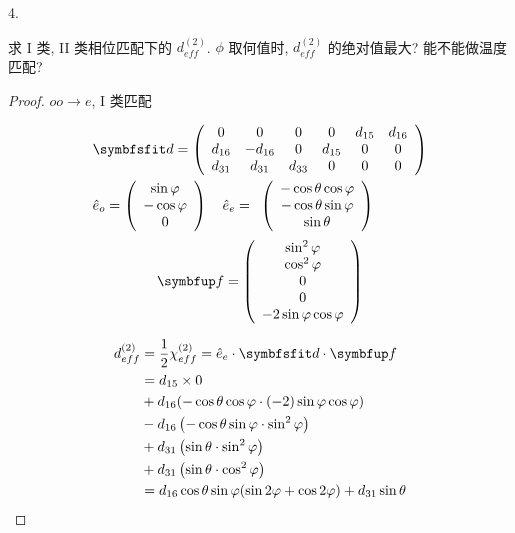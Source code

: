 \begin{exercise}

4. 

求 I 类, II 类相位匹配下的 $d_{eff}^{(2)}$. $\phi$ 取何值时, 
$d_{eff}^{(2)}$ 的绝对值最大? 能不能做温度匹配?

\end{exercise}

\begin{proof}

$oo\rightarrow e$, I 类匹配

$$
\begin{aligned}
&\Tens{d}=\left(\begin{array}{cccccc}
{0} & {0} & {0} & {0} & {d_{15}}&{ d_{16}} \\
{d_{16}} & {-d_{16}} & {0} & {d_{15}} & {0} & {0} \\
{d_{31}} & {d_{31}} & {d_{33}} & {0} & {0} &{0}
\end{array}\right)\\
&\hat{e}_o=\left(\begin{array}{cc}
{\sin \varphi} \\
{-\cos \varphi} \\
{0}
\end{array}\right) \quad \hat{e}_{e}=\begin{array}{c}
{\left(\begin{array}{c}
{-\cos \theta \cos \varphi} \\
{-\cos \theta \sin \varphi} \\
{\sin \theta}
\end{array}\right)}
\end{array}
\end{aligned}
$$
$$
\Vect{f}=\left(\begin{array}{c}
{\sin ^{2} \varphi} \\
{\cos ^{2} \varphi} \\
{0} \\
{0} \\
{-2 \sin \varphi \cos \varphi}
\end{array}\right)
$$

$$
\begin{aligned}
d_{e f f}^{(2)} &=\frac{1}{2} \chi_{e f f}^{(2)}=\hat{e}_{e} \cdot \Tens{d} \cdot \Vect{f} \\
&=d_{15} \times 0 \\
&+d_{16}(-\cos\theta \cos \varphi \cdot(-2) \sin \varphi \cos\varphi) \\
&-d_{16}\left(-\cos \theta \sin \varphi \cdot \sin ^{2} \varphi\right) \\
&+d_{31}\left(\sin \theta \cdot \sin ^{2} \varphi\right) \\
&+d_{31}\left(\sin \theta \cdot \cos ^{2} \varphi\right) \\
&= d_{16}  \cos \theta \sin \varphi(\sin 2 \varphi+\cos 2 \varphi)+d_{31} \sin \theta
\end{aligned}
$$



\end{proof}
